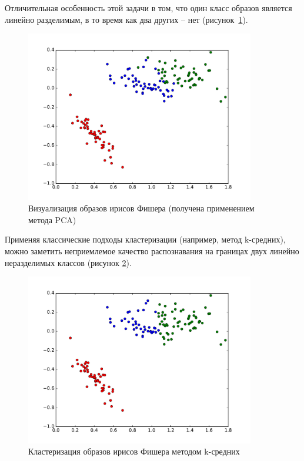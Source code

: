 Отличительная особенность этой задачи в том, что один класс образов является линейно разделимым, в то время как два других -- нет (рисунок~\ref{fig:irises_visualize}).

\begin{figure}[h]
	\begin{center}
		\includegraphics[width=10cm]{man-source/images/ch3/pic3-8.pdf}
		\caption{Визуализация образов ирисов Фишера (получена применением метода PCA)}				
		\label{fig:irises_visualize}
	\end{center}
\end{figure}

Применяя классические подходы кластеризации (например, метод k-средних), можно заметить неприемлемое качество распознавания на границах двух линейно неразделимых классов (рисунок \ref{fig:kmeans}).

\begin{figure}[h]
	\begin{center}
		\includegraphics[width=10cm]{man-source/images/ch3/pic3-9.pdf}
		\caption{Кластеризация образов ирисов Фишера методом k-средних}			
		\label{fig:kmeans}
	\end{center}
\end{figure}

